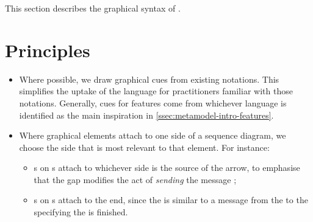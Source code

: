 This section describes the graphical syntax of \langname.


\section{Principles}


\begin{itemize}
\item Where possible, we draw graphical cues from existing notations.
  This simplifies the uptake of the language for practitioners
  familiar with those notations.  Generally, cues for features come
  from whichever language is identified as the main inspiration in
  \cref{ssec:metamodel-intro-features}.
\item Where graphical elements attach to one side of a sequence diagram,
  we choose the side that is most relevant to that element.  For instance:
  \begin{itemize}
  \item \msequencegap s on \marrowaction s attach to whichever
    side is the source of the arrow, to emphasise that the gap modifies
    the act of \emph{sending} the message ;
  \item \msequencegap s on \mfinalaction s attach to the \mtarget{} end,
    since the \mfinalaction{} is similar to a message from the \mtarget{} to
    the \mworld{} specifying the \mtarget{} is finished.
  \end{itemize}
\end{itemize}

